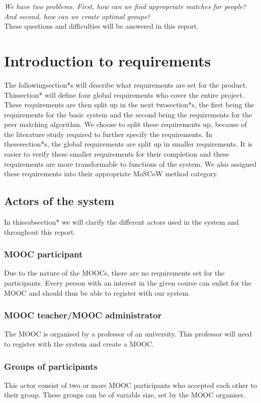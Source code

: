 \emph{We have two problems. First, how can we find appropriate matches for people? And second, how can we create optimal groups?}\\

These questions and difficulties will be answered in this report.

\section*{Introduction to requirements}
The followingsection*s will describe what requirements are set for the product.
Thissection* will define four global requirements who cover the entire project.
These requirements are then split up in the next twosection*s, the first being the requirements for the basic system and the second being the requirements for the peer matching algorithm.
We choose to split these requirements up, because of the literature study required to further specify the requirements.
In thesesection*s, the global requirements are split up in smaller requirements.
It is easier to verify these smaller requirements for their completion and these requirements are more transformable to functions of the system.
We also assigned these requirements into their appropriate MoSCoW \cite{highsmith2001agile} method category.

\subsection*{Actors of the system}
In thissubsection* we will clarify the different actors used in the system and throughout this report.
\subsubsection*{MOOC participant}
Due to the nature of the MOOCs, there are no requirements set for the participants.
Every person with an interest in the given course can enlist for the MOOC and should thus be able to register with our system.
\subsubsection*{MOOC teacher/MOOC administrator} 
The MOOC is organised by a professor of an university.
This professor will need to register with the system and create a MOOC.
\subsubsection*{Groups of participants}
This actor consist of two or more MOOC participants who accepted each other to their group.
These groups can be of variable size, set by the MOOC organiser.

